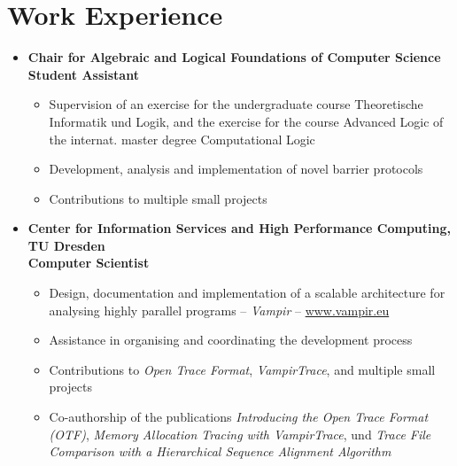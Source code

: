 \section*{Work Experience}
\begin{itemize}
	\item {}
		\textbf{Chair for Algebraic and Logical Foundations of Computer Science} \\
		\textbf{Student Assistant}
		\begin{itemize}
			\item Supervision of an exercise for the undergraduate course Theoretische Informatik und Logik, and the exercise for the course Advanced Logic of the internat. master degree Computational Logic
			\item Development, analysis and implementation of novel barrier protocols
			\item Contributions to multiple small projects
		\end{itemize}
	\item {}
		\textbf{Center for Information Services and High Performance Computing, TU Dresden} \\
		\textbf{Computer Scientist}
		\begin{itemize}
			\item Design, documentation and implementation of a scalable architecture for analysing highly parallel programs -- \emph{Vampir} -- \href{http://www.vampir.eu}{www.vampir.eu}
			\item Assistance in organising and coordinating the development process
			\item Contributions to \emph{Open Trace Format}, \emph{VampirTrace}, and multiple small projects
			\item Co-authorship of the publications \emph{Introducing the Open Trace Format (OTF)}, 
			\emph{Memory Allocation Tracing with VampirTrace}, und \emph{Trace File Comparison with a Hierarchical Sequence Alignment Algorithm}
		\end{itemize}
\end{itemize}

\customhrule
